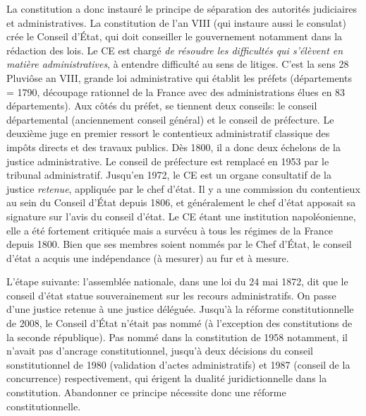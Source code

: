 \documentclass[math]{cours}
\begin{document}
La constitution a donc instauré le principe de séparation des autorités judiciaires et administratives.
La constitution de l'an VIII (qui instaure aussi le consulat) crée le Conseil d'État, qui doit conseiller le gouvernement notamment dans la rédaction des lois.
Le CE est chargé \textit{de résoudre les difficultés qui s'élèvent en matière administratives}, à entendre difficulté au sens de litiges.
C'est la sens
28 Pluviôse an VIII, grande loi administrative qui établit les préfets (départements = 1790, découpage rationnel de la France avec des administrations élues en 83 départements).
Aux côtés du préfet, se tiennent deux conseils: le conseil départemental (anciennement conseil général) et le conseil de préfecture.
Le deuxième juge en premier ressort le contentieux administratif classique des impôts directs et des travaux publics.
Dès 1800, il a donc deux échelons de la justice administrative.
Le conseil de préfecture est remplacé en 1953 par le tribunal administratif.
Jusqu'en 1972, le CE est un organe consultatif de la justice \emph{retenue}, appliquée par le chef d'état.
Il y a une commission du contentieux au sein du Conseil d'État depuis 1806, et généralement le chef d'état apposait sa signature sur l'avis du conseil d'état.
Le CE étant une institution napoléonienne, elle a été fortement critiquée mais a survécu à tous les régimes de la France depuis 1800.
Bien que ses membres soient nommés par le Chef d'État, le conseil d'état a acquis une indépendance (à mesurer) au fur et à mesure.

L'étape suivante: l'assemblée nationale, dans une loi du 24 mai 1872, dit que le conseil d'état statue souverainement sur les recours administratifs.
On passe d'une justice retenue à une justice déléguée.
Jusqu'à la réforme constitutionnelle de 2008, le Conseil d'État n'était pas nommé (à l'exception des constitutions de la seconde république).
Pas nommé dans la constitution de 1958 notamment, il n'avait pas d'ancrage constitutionnel, jusqu'à deux décisions du conseil sonstitutionnel de 1980 (validation d'actes administratifs) et 1987 (conseil de la concurrence) respectivement, qui érigent la dualité juridictionnelle dans la constitution.
Abandonner ce principe nécessite donc une réforme constitutionnelle.
\end{document}
